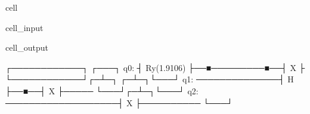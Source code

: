 \documentclass[letterpaper,10pt,english]{jupyterBook}
\begin{document}
\begin{sphinxuseclass}{cell}\begin{sphinxVerbatimInput}

\begin{sphinxuseclass}{cell_input}
\begin{sphinxVerbatim}[commandchars=\\\{\}]
   
    


  


\end{sphinxVerbatim}

\end{sphinxuseclass}\end{sphinxVerbatimInput}
\begin{sphinxVerbatimOutput}

\begin{sphinxuseclass}{cell_output}
\begin{sphinxVerbatim}[commandchars=\\\{\}]
     ┌────────────┐               ┌───┐
q\PYGZus{}0: ┤ Ry(1.9106) ├──■─────────■──┤ X ├
     └────────────┘┌─┴─┐     ┌─┴─┐└───┘
q\PYGZus{}1: ──────────────┤ H ├──■──┤ X ├─────
                   └───┘┌─┴─┐└───┘
q\PYGZus{}2: ───────────────────┤ X ├──────────
                        └───┘
\end{sphinxVerbatim}

\end{sphinxuseclass}\end{sphinxVerbatimOutput}

\end{sphinxuseclass}
\end{document}
